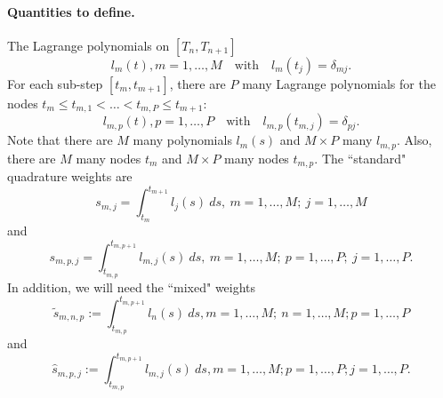 \documentclass{article}
\begin{document}
\paragraph{Quantities to define.}
The Lagrange polynomials on $[T_n, T_{n+1}]$
\begin{equation}
	l_m(t), m = 1, \ldots, M \quad \text{with} \quad l_m(t_j) = \delta_{mj}.
\end{equation}
For each sub-step $[t_m, t_{m+1}]$, there are $P$ many Lagrange polynomials for the nodes $t_{m} \leq t_{m,1} < \ldots < t_{m,P} \leq t_{m+1}$:
\begin{equation}
	l_{m,p}(t), p=1, \ldots, P \quad \text{with} \quad l_{m,p}(t_{m,j}) = \delta_{pj}.
\end{equation}
Note that there are $M$ many polynomials $l_m(s)$ and $M \times P$ many $l_{m,p}$.
Also, there are $M$ many nodes $t_m$ and $M \times P$ many nodes $t_{m,p}$.
The ``standard" quadrature weights are
\begin{equation}
	s_{m,j} = \int_{t_m}^{t_{m+1}} l_j(s)~ds, \ m=1, \ldots, M; \ j=1, \ldots, M
\end{equation}
and
\begin{equation}
	s_{m,p,j} = \int_{t_{m,p}}^{t_{m,p+1}}  l_{m,j}(s)~ds, \ m=1, \ldots, M; \ p=1, \ldots, P; \ j=1, \ldots, P.
\end{equation}
In addition, we will need the ``mixed" weights
\begin{equation}
	\tilde{s}_{m,n,p} := \int_{t_{m,p}}^{t_{m,p+1}} l_{n}(s)~ds, m=1, \ldots, M; \ n=1, \ldots, M; p=1, \ldots, P
\end{equation}
and
\begin{equation}
	\hat{s}_{m,p,j} := \int_{t_{m,p}}^{t_{m,p+1}} l_{m,j}(s)~ds, m=1, \ldots, M; p=1, \ldots, P; j=1, \ldots, P.
\end{equation}
\end{document}
